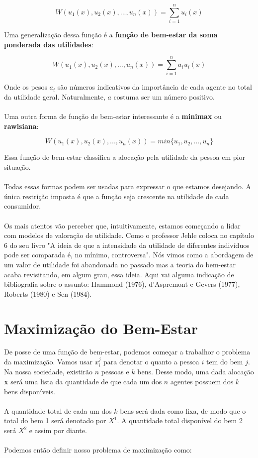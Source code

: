 \documentclass[a4paper,11pt,oneside]{book}
\theoremstyle{definition}
\theoremstyle{break}
\begin{document}
$$ W(u_1(x),u_2(x),...,u_n(x)) = \displaystyle \sum^n_{i = 1} u_i(x)$$

Uma generalização dessa função é a \textbf{função de bem-estar da soma ponderada das utilidades}:

$$ W(u_1(x),u_2(x),...,u_n(x)) = \displaystyle \sum^n_{i = 1} a_iu_i(x)$$

Onde os pesos $a_i$ são números indicativos da importância de cada agente no total da utilidade geral. Naturalmente, $a$ costuma ser um número positivo.
\\
\\
Uma outra forma de função de bem-estar interessante é a \textbf{minimax} ou \textbf{rawlsiana}:

$$ W(u_1(x),u_2(x),...,u_n(x)) = min\{ u_1, u_2, ..., u_n \} $$

Essa função de bem-estar classifica a alocação pela utilidade da pessoa em pior situação.
\\
\\
Todas essas formas podem ser usadas para expressar o que estamos desejando. A única restrição imposta é que a função seja crescente na utilidade de cada consumidor.
\\
\\
Os mais atentos vão perceber que, intuitivamente, estamos começando a lidar com modelos de valoração de utilidade. Como o professor Jehle coloca no capítulo 6 do seu livro "A ideia de que a intensidade da utilidade de diferentes indivíduos pode ser comparada é, no mínimo, controversa". Nós vimos como a abordagem de um valor de utilidade foi abandonada no passado mas a teoria do bem-estar acaba revisitando, em algum grau, essa ideia. Aqui vai alguma indicação de bibliografia sobre o assunto: Hammond (1976), d'Aspremont e Gevers (1977), Roberts (1980) e Sen (1984).

\section{Maximização do Bem-Estar}

De posse de uma função de bem-estar, podemos começar a trabalhor o problema da maximização. Vamos usar $x_i^j$ para denotar o quanto a pessoa $i$ tem do bem $j$. Na nossa sociedade, existirão $n$ pessoas e $k$ bens. Desse modo, uma dada alocação \textbf{x} será uma lista da quantidade de que cada um dos $n$ agentes possuem dos $k$ bens disponíveis.
\\
\\
A quantidade total de cada um dos $k$ bens será dada como fixa, de modo que o total do bem 1 será denotado por $X^1$. A quantidade total disponível do bem 2 será $X^2$ e assim por diante.
\\
\\
Podemos então definir nosso problema de maximização como:
\end{document}
